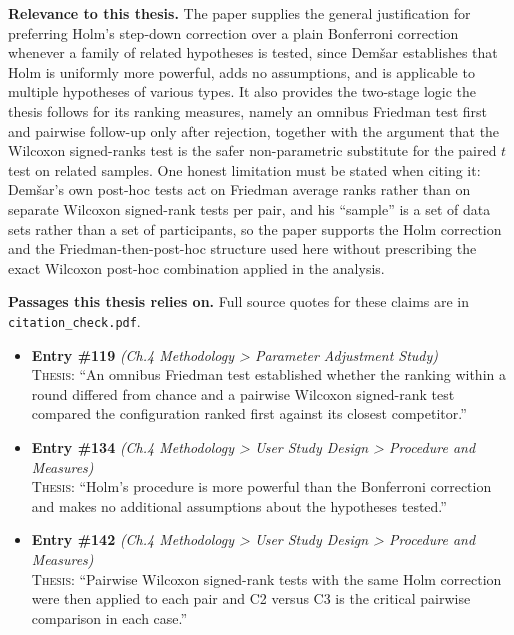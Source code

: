 \documentclass[11pt, a4paper]{article}
\begin{document}
\textbf{Relevance to this thesis.} The paper supplies the general justification for preferring Holm's step-down correction over a plain Bonferroni correction whenever a family of related hypotheses is tested, since Dem\v{s}ar establishes that Holm is uniformly more powerful, adds no assumptions, and is applicable to multiple hypotheses of various types. It also provides the two-stage logic the thesis follows for its ranking measures, namely an omnibus Friedman test first and pairwise follow-up only after rejection, together with the argument that the Wilcoxon signed-ranks test is the safer non-parametric substitute for the paired $t$ test on related samples. One honest limitation must be stated when citing it: Dem\v{s}ar's own post-hoc tests act on Friedman average ranks rather than on separate Wilcoxon signed-rank tests per pair, and his ``sample'' is a set of data sets rather than a set of participants, so the paper supports the Holm correction and the Friedman-then-post-hoc structure used here without prescribing the exact Wilcoxon post-hoc combination applied in the analysis.

\vspace{8pt}


\textbf{Passages this thesis relies on.} Full source quotes for these claims are in \texttt{citation\_check.pdf}.
\begin{itemize}[leftmargin=1.2em,itemsep=4pt]
\item \textbf{Entry \#119} \textit{(Ch.4 Methodology > Parameter Adjustment Study)}\\
\textsc{Thesis:} ``An omnibus Friedman test established whether the ranking within a round differed from chance and a pairwise Wilcoxon signed-rank test compared the configuration ranked first against its closest competitor.''
\item \textbf{Entry \#134} \textit{(Ch.4 Methodology > User Study Design > Procedure and Measures)}\\
\textsc{Thesis:} ``Holm's procedure is more powerful than the Bonferroni correction and makes no additional assumptions about the hypotheses tested.''
\item \textbf{Entry \#142} \textit{(Ch.4 Methodology > User Study Design > Procedure and Measures)}\\
\textsc{Thesis:} ``Pairwise Wilcoxon signed-rank tests with the same Holm correction were then applied to each pair and C2 versus C3 is the critical pairwise comparison in each case.''
\end{itemize}
\end{document}
